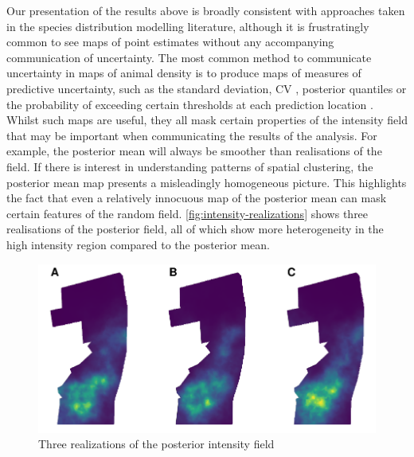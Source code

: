 \documentclass{statsoc}
\begin{document}
Our presentation of the results above is broadly consistent with approaches taken in the species distribution modelling literature, although it is frustratingly common to see maps of point estimates without any accompanying communication of uncertainty.  The most common method to communicate uncertainty in maps of animal density is to produce maps of measures of predictive uncertainty, such as the standard deviation, CV \citep{fuller_novel_2018, vallejo_responses_2017,bradbury_mapping_2014}, posterior quantiles or the probability of exceeding certain thresholds at each prediction location \citep{russell_avoidance_2016, wilson_hierarchical_2010}.  Whilst such maps are useful, they all mask certain properties of the intensity field that may be important when communicating the results of the analysis. For example, the posterior mean will always be smoother than realisations of the field.  If there is interest in understanding patterns of spatial clustering, the posterior mean map presents a misleadingly homogeneous picture.  This highlights the fact that even a relatively innocuous map of the posterior mean can mask certain features of the random field. \autoref{fig:intensity-realizations} shows three realisations of the posterior field, all of which show more heterogeneity in the high intensity region compared to the posterior mean.
\begin{figure}[!htb]
	\includegraphics{figures/intensity_realized.pdf}
	\caption{Three realizations of the posterior intensity field}
	\label{fig:intensity-realizations}
\end{figure}
\end{document}

